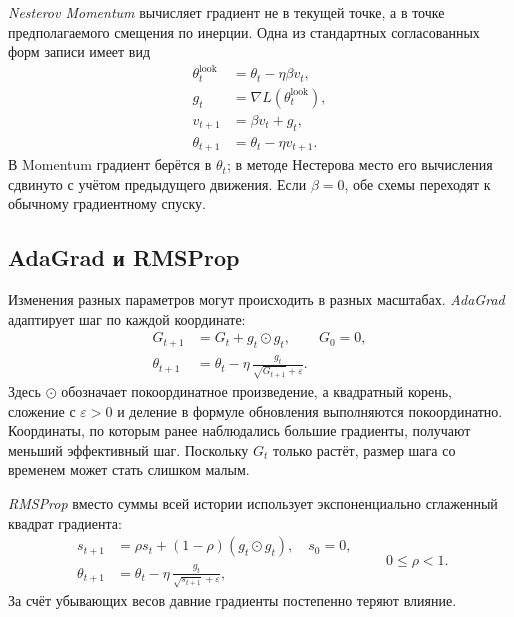 \documentclass[12pt,a4paper]{article}
\begin{document}
\emph{Nesterov Momentum} вычисляет градиент не в текущей точке,
а в точке предполагаемого смещения по инерции. Одна из стандартных
согласованных форм записи имеет вид
\begin{equation}
    \begin{aligned}
       \theta_t^{\mathrm{look}}&=\theta_t-\eta\beta v_t,\\
       g_t&=\nabla L(\theta_t^{\mathrm{look}}),\\
       v_{t+1}&=\beta v_t+g_t,\\
       \theta_{t+1}&=\theta_t-\eta v_{t+1}.
    \end{aligned}
    \label{eq:nesterov}
\end{equation}
В Momentum градиент берётся в $\theta_t$; в методе Нестерова
место его вычисления сдвинуто с учётом предыдущего движения.
Если $\beta=0$, обе схемы переходят к обычному градиентному спуску.

\subsection{AdaGrad и RMSProp}

Изменения разных параметров могут происходить в разных масштабах.
\emph{AdaGrad} адаптирует шаг по каждой координате:
\begin{equation}
    \begin{aligned}
       G_{t+1}&=G_t+g_t\odot g_t,\qquad G_0=0,\\
       \theta_{t+1}&=\theta_t-
       \eta\,\frac{g_t}{\sqrt{G_{t+1}}+\varepsilon}.
    \end{aligned}
    \label{eq:adagrad}
\end{equation}
Здесь $\odot$ обозначает покоординатное произведение,
а квадратный корень, сложение с $\varepsilon>0$ и деление
в формуле обновления выполняются покоординатно.
Координаты, по которым ранее наблюдались большие градиенты,
получают меньший эффективный шаг. Поскольку $G_t$ только растёт,
размер шага со временем может стать слишком малым.

\emph{RMSProp} вместо суммы всей истории использует
экспоненциально сглаженный квадрат градиента:
\begin{equation}
    \begin{aligned}
       s_{t+1}&=\rho s_t+(1-\rho)(g_t\odot g_t),\quad s_0=0,\\
       \theta_{t+1}&=\theta_t-
       \eta\,\frac{g_t}{\sqrt{s_{t+1}}+\varepsilon},
    \end{aligned}
    \qquad 0\le\rho<1.
    \label{eq:rmsprop}
\end{equation}
За счёт убывающих весов давние градиенты постепенно теряют влияние.
\end{document}
